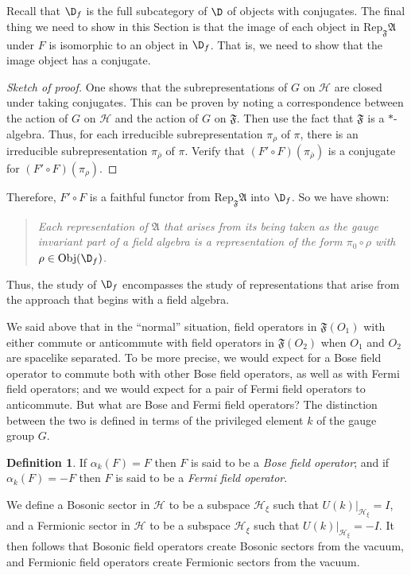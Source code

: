 \documentclass[11pt]{article}
\theoremstyle{definition}
\theoremstyle{definition}
\newtheorem{defn}[thm]{Definition}
\theoremstyle{remark}
\newcommand{\Obj}{\mathrm{Obj}}
\def\2#1{{\mathcal #1}}
\def\ol#1{{\overline #1}}
\def\al#1{{\mathfrak #1}}
\def\a{\alpha} \def\b{\beta} \def\g{\gamma} \def\d{\delta}
\newcommand{\Rep}{\mathrm{Rep}}
\begin{document}
Recall that $\D _f$ is the full subcategory of $\D$ of objects with
conjugates.  The final thing we need to show in this Section is that
the image of each object in $\Rep _{\al F}\al A$ under $F$ is
isomorphic to an object in $\D _f$.  That is, we need to show that the
image object has a conjugate.

\begin{proof}[Sketch of proof] One shows that the subrepresentations
  of $G$ on $\2H$ are closed under taking conjugates.  This can be
  proven by noting a correspondence between the action of $G$ on $\2H$
  and the action of $G$ on $\al F$.  Then use the fact that $\al F$ is
  a $*$-algebra.  Thus, for each irreducible subrepresentation $\pi
  _\rho $ of $\pi$, there is an irreducible subrepresentation $\pi
  _{\ol\rho}$ of $\pi$.  Verify that $(F'\circ F)(\pi _{\ol\rho})$ is
  a conjugate for $(F'\circ F)(\pi _\rho )$. \end{proof}

\noindent Therefore, $F'\circ F$ is a faithful functor
from $\Rep _{\al F}\al A$ into $\D _f$.  So we have
shown:
\begin{quote} \textit{Each representation of $\al A$ that arises from
    its being taken as the gauge invariant part of a field algebra is
    a representation of the form $\pi _0\circ \rho$ with $\rho \in
    \Obj (\D _f)$.}  \end{quote} Thus, the study of $\D _f$
encompasses the study of representations that arise from the approach
that begins with a field algebra.  


We said above that in the ``normal'' situation, field operators in
$\al F(O_1)$ with either commute or anticommute with field operators
in $\al F(O_2)$ when $O_1$ and $O_2$ are spacelike separated.  To be
more precise, we would expect for a Bose field operator to commute
both with other Bose field operators, as well as with Fermi field
operators; and we would expect for a pair of Fermi field operators to
anticommute.  But what are Bose and Fermi field operators?  The
distinction between the two is defined in terms of the privileged
element $k$ of the gauge group $G$.  

\begin{defn} If $\a _k(F)=F$ then $F$ is said to be a \emph{Bose field
    operator}; and if $\a _k(F)=-F$ then $F$ is said to be a
  \emph{Fermi field operator}. \end{defn}

We define a Bosonic sector in $\2H$ to be a subspace $\2H _{\xi}$ such
that $U(k)|_{\2H _{\xi}}=I$, and a Fermionic sector in $\2H$ to be a
subspace $\2H _{\xi}$ such that $U(k)|_{\2H_{\xi}}=-I$.  It then
follows that Bosonic field operators create Bosonic sectors from the
vacuum, and Fermionic field operators create Fermionic sectors from
the vacuum.  
\end{document}

